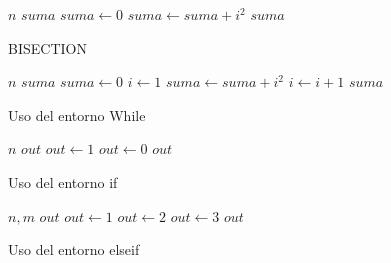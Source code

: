 \documentclass{document}
\begin{document}
\begin{algorithm}
\begin{algorithmic}[1]
  \REQUIRE $n$
  \ENSURE  $suma$
  \STATE $suma \leftarrow 0$
  \STATE $suma\leftarrow suma+i^2$
  \ENDFOR
  \RETURN $suma$
\end{algorithmic} 
  
  \caption{BISECTION}
  \label{a1}
\end{algorithm}

\begin{algorithm}
  \begin{algorithmic}[0]
    \REQUIRE $n$
    \ENSURE  $suma$
    \STATE $suma \leftarrow 0$
    \STATE $i \leftarrow 1$
    \STATE $suma\leftarrow suma+i^2$
    \STATE $i \leftarrow i+1$
    \ENDWHILE
    \RETURN $suma$
  \end{algorithmic}
  \caption{Uso del entorno While}
  \label{a2}
\end{algorithm}

\begin{algorithm}
  \begin{algorithmic}[0]
    \REQUIRE $n$
    \ENSURE  $out$
    \STATE $out\leftarrow 1$
    \ELSE 
    \STATE $out\leftarrow 0$
    \ENDIF
    \RETURN $out$
  \end{algorithmic}
  \caption{Uso del entorno if}
  \label{a3}
\end{algorithm}
\begin{algorithm}
  \begin{algorithmic}[0]
    \REQUIRE $n, m$
    \ENSURE  $out$
    \STATE $out\leftarrow 1$
    \STATE $out\leftarrow 2$
    \ELSE
    \STATE $out\leftarrow 3$
    \ENDIF
    \RETURN $out$
  \end{algorithmic}
  \caption{Uso del entorno elseif}
  \label{a4}
   
\end{algorithm}
\end{document}
